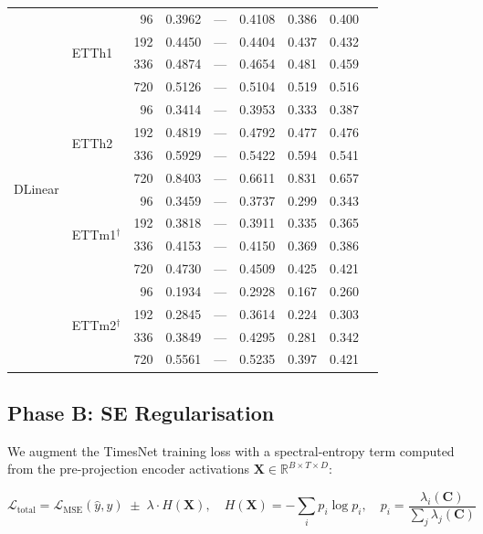 \documentclass[10pt]{article}
\begin{document}
\begin{table}[t]
{\begin{tabular}{llr ccc ccc}
\midrule
\multirow{16}{*}{DLinear}
  & \multirow{4}{*}{ETTh1}
    &  96 & 0.3962 & — & 0.4108 & 0.386 & 0.400 \\
  & & 192 & 0.4450 & — & 0.4404 & 0.437 & 0.432 \\
  & & 336 & 0.4874 & — & 0.4654 & 0.481 & 0.459 \\
  & & 720 & 0.5126 & — & 0.5104 & 0.519 & 0.516 \\
\cmidrule(lr){2-8}
  & \multirow{4}{*}{ETTh2}
    &  96 & 0.3414 & — & 0.3953 & 0.333 & 0.387 \\
  & & 192 & 0.4819 & — & 0.4792 & 0.477 & 0.476 \\
  & & 336 & 0.5929 & — & 0.5422 & 0.594 & 0.541 \\
  & & 720 & 0.8403 & — & 0.6611 & 0.831 & 0.657 \\
\cmidrule(lr){2-8}
  & \multirow{4}{*}{ETTm1$^\dagger$}
    &  96 & 0.3459 & — & 0.3737 & 0.299 & 0.343 \\
  & & 192 & 0.3818 & — & 0.3911 & 0.335 & 0.365 \\
  & & 336 & 0.4153 & — & 0.4150 & 0.369 & 0.386 \\
  & & 720 & 0.4730 & — & 0.4509 & 0.425 & 0.421 \\
\cmidrule(lr){2-8}
  & \multirow{4}{*}{ETTm2$^\dagger$}
    &  96 & 0.1934 & — & 0.2928 & 0.167 & 0.260 \\
  & & 192 & 0.2845 & — & 0.3614 & 0.224 & 0.303 \\
  & & 336 & 0.3849 & — & 0.4295 & 0.281 & 0.342 \\
  & & 720 & 0.5561 & — & 0.5235 & 0.397 & 0.421 \\
\bottomrule
\end{tabular}
}
\end{table}

\subsection{Phase B: SE Regularisation}

We augment the TimesNet training loss with a spectral-entropy term computed from
the pre-projection encoder activations $\mathbf{X} \in \mathbb{R}^{B \times T \times D}$:

\begin{equation}
\mathcal{L}_\text{total} = \mathcal{L}_\text{MSE}(\hat{y}, y)
  \;\pm\; \lambda \cdot H(\mathbf{X}),
\quad
H(\mathbf{X}) = -\sum_i p_i \log p_i,
\quad
p_i = \frac{\lambda_i(\mathbf{C})}{\sum_j \lambda_j(\mathbf{C})}
\label{eq:se_loss}
\end{equation}
\end{document}
